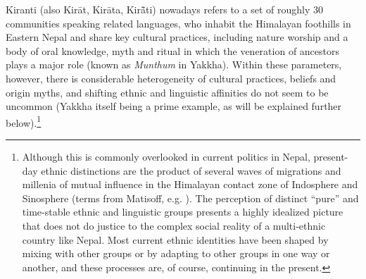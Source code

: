 Kiranti (also Kirāt, Kirāta, Kirā̃ti) nowadays refers to a set of roughly 30 communities speaking related languages, who inhabit the Himalayan foothills in Eastern Nepal and share key cultural practices, including nature worship and a body of oral knowledge, myth and ritual in which the veneration of ancestors plays a major role (known as \emph{Munthum} in Yakkha). Within these parameters, however, there is considerable heterogeneity of cultural practices, beliefs and origin myths, and shifting ethnic and linguistic affinities do not seem to be uncommon (Yakkha itself being a prime example, as will be explained further below).\footnote{Although this is commonly overlooked in current politics in Nepal,  present-day ethnic distinctions are the product of several waves of migrations and millenia of mutual influence in the Himalayan contact zone of Indosphere and Sinosphere (terms from Matisoff, e.g. \citealt{Matisoff1990_On}). The perception of distinct “pure” and time-stable ethnic and linguistic groups presents a highly idealized picture that does not do justice to the complex social reality of a multi-ethnic country like Nepal. Most current ethnic identities have been shaped by mixing with other groups or by adapting to other groups in one way or another, and these processes are, of course, continuing in the present.} 

